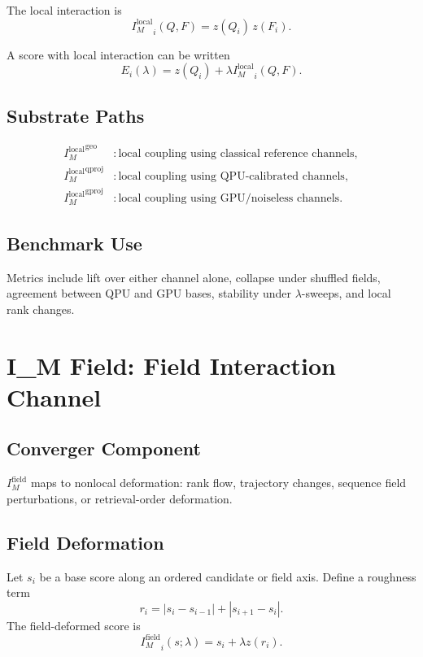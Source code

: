 \documentclass[11pt]{article}
\newcommand{\Iml}{I_M^{\mathrm{local}}}
\newcommand{\Imf}{I_M^{\mathrm{field}}}
\newcommand{\geo}{\mathrm{geo}}
\newcommand{\qproj}{\mathrm{qproj}}
\newcommand{\gproj}{\mathrm{gproj}}
\begin{document}
The local interaction is
\begin{equation}
  {\Iml}_i(Q,F) = z(Q_i)\,z(F_i).
\end{equation}

A score with local interaction can be written
\begin{equation}
  E_i(\lambda) = z(Q_i) + \lambda {\Iml}_i(Q,F).
\end{equation}

\subsection{Substrate Paths}

\begin{align}
  {\Iml}^{\geo}   &: \text{local coupling using classical reference channels},\\
  {\Iml}^{\qproj} &: \text{local coupling using QPU-calibrated channels},\\
  {\Iml}^{\gproj} &: \text{local coupling using GPU/noiseless channels}.
\end{align}

\subsection{Benchmark Use}

Metrics include lift over either channel alone, collapse under shuffled fields,
agreement between QPU and GPU bases, stability under \(\lambda\)-sweeps, and
local rank changes.

\section{I\_M Field: Field Interaction Channel}

\subsection{Converger Component}

\(\Imf\) maps to nonlocal deformation: rank flow, trajectory changes, sequence
field perturbations, or retrieval-order deformation.

\subsection{Field Deformation}

Let \(s_i\) be a base score along an ordered candidate or field axis. Define a
roughness term
\begin{equation}
  r_i = |s_i-s_{i-1}| + |s_{i+1}-s_i|.
\end{equation}
The field-deformed score is
\begin{equation}
  {\Imf}_i(s;\lambda) = s_i + \lambda z(r_i).
\end{equation}
\end{document}
